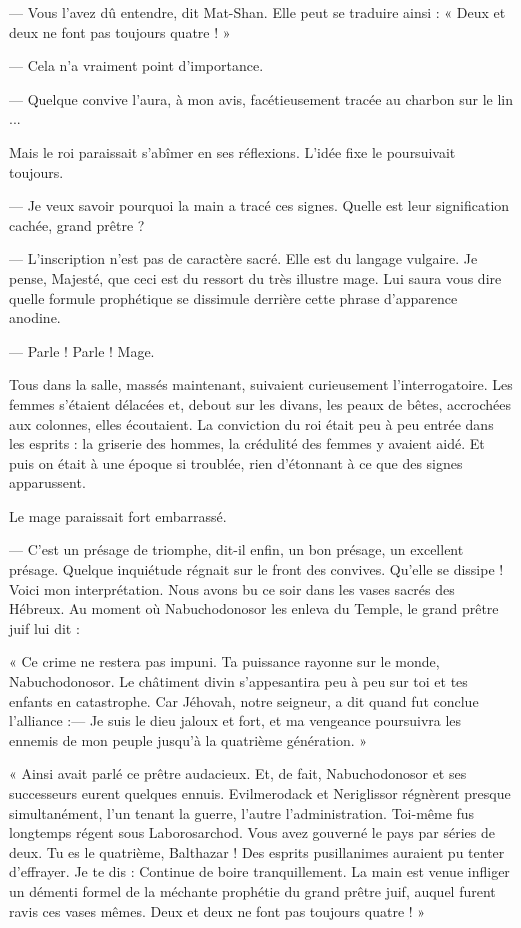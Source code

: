 \documentclass[a4paper, 11pt, oneside, polutonikogreek, french]{article}
\begin{document}
--- Vous l'avez dû entendre, dit Mat-Shan. Elle peut se traduire ainsi : « Deux et deux ne font pas toujours quatre ! »

--- Cela n'a vraiment point d'importance.

--- Quelque convive l'aura, à mon avis, facétieusement tracée au charbon sur le lin ...

Mais le roi paraissait s'abîmer en ses réflexions. L'idée fixe le poursuivait toujours.

--- Je veux savoir pourquoi la main a tracé ces signes. Quelle est leur signification cachée, grand prêtre ?

--- L'inscription n'est pas de caractère sacré. Elle est du langage vulgaire. Je pense, Majesté, que ceci est du ressort du très illustre mage. Lui saura vous dire quelle formule prophétique se dissimule derrière cette phrase d'apparence anodine.

--- Parle ! Parle ! Mage.

Tous dans la salle, massés maintenant, suivaient curieusement l'interrogatoire. Les femmes s'étaient délacées et, debout sur les divans, les peaux de bêtes, accrochées aux colonnes, elles écoutaient. La conviction du roi était peu à peu entrée dans les esprits : la griserie des hommes, la crédulité des femmes y avaient aidé. Et puis on était à une époque si troublée, rien d'étonnant à ce que des signes apparussent.

Le mage paraissait fort embarrassé.

--- C'est un présage de triomphe, dit-il enfin, un bon présage, un excellent présage. Quelque inquiétude régnait sur le front des convives. Qu'elle se dissipe ! Voici mon interprétation. Nous avons bu ce soir dans les vases sacrés des Hébreux. Au moment où Nabuchodonosor les enleva du Temple, le grand prêtre juif lui dit :

« Ce crime ne restera pas impuni. Ta puissance rayonne sur le monde, Nabuchodonosor. Le châtiment divin s'appesantira peu à peu sur toi et tes enfants en catastrophe. Car Jéhovah, notre seigneur, a dit quand fut conclue l'alliance :--- Je suis le dieu jaloux et fort, et ma vengeance poursuivra les ennemis de mon peuple jusqu'à la quatrième génération. »

« Ainsi avait parlé ce prêtre audacieux. Et, de fait, Nabuchodonosor et ses successeurs eurent quelques ennuis. Evilmerodack et Neriglissor régnèrent presque simultanément, l'un tenant la guerre, l'autre l'administration. Toi-même fus longtemps régent sous Laborosarchod. Vous avez gouverné le pays par séries de deux. Tu es le quatrième, Balthazar ! Des esprits pusillanimes auraient pu tenter d'effrayer. Je te dis : Continue de boire tranquillement. La main est venue infliger un démenti formel de la méchante prophétie du grand prêtre juif, auquel furent ravis ces vases mêmes. Deux et deux ne font pas toujours quatre ! »
\end{document}
